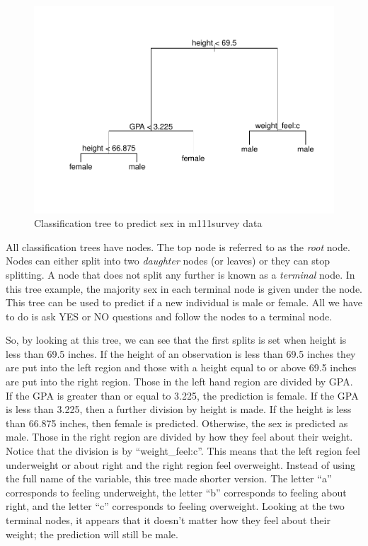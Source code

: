 \documentclass[12pt,twoside]{reedthesis}
\begin{document}
  \begin{figure}
  
  {\centering \includegraphics{A_Random_Forest_Model_for_Computer-Assisted_Activity-Recognition_files/figure-latex/unnamed-chunk-4-1} 
  
  }
  
  \caption[Classification tree to predict sex in m111survey data]{Classification tree to predict sex in m111survey data}\label{fig:unnamed-chunk-4}
  \end{figure}
  
  All classification trees have nodes. The top node is referred to as the
  \emph{root} node. Nodes can either split into two \emph{daughter} nodes
  (or leaves) or they can stop splitting. A node that does not split any
  further is known as a \emph{terminal} node. In this tree example, the
  majority sex in each terminal node is given under the node. This tree
  can be used to predict if a new individual is male or female. All we
  have to do is ask YES or NO questions and follow the nodes to a terminal
  node.
  
  So, by looking at this tree, we can see that the first splits is set
  when height is less than 69.5 inches. If the height of an observation is
  less than 69.5 inches they are put into the left region and those with a
  height equal to or above 69.5 inches are put into the right region.
  Those in the left hand region are divided by GPA. If the GPA is greater
  than or equal to 3.225, the prediction is female. If the GPA is less
  than 3.225, then a further division by height is made. If the height is
  less than 66.875 inches, then female is predicted. Otherwise, the sex is
  predicted as male. Those in the right region are divided by how they
  feel about their weight. Notice that the division is by
  ``weight\_feel:c''. This means that the left region feel underweight or
  about right and the right region feel overweight. Instead of using the
  full name of the variable, this tree made shorter version. The letter
  ``a'' corresponds to feeling underweight, the letter ``b'' corresponds
  to feeling about right, and the letter ``c'' corresponds to feeling
  overweight. Looking at the two terminal nodes, it appears that it
  doesn't matter how they feel about their weight; the prediction will
  still be male.
  
\end{document}
